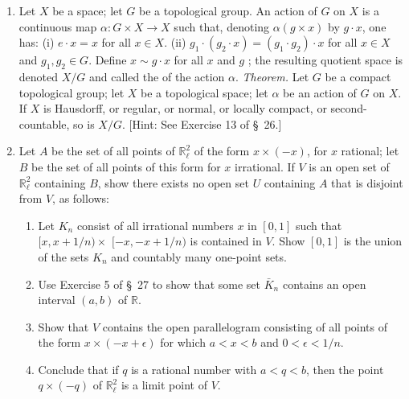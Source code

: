 \begin{enumerate}[itemsep=0.4em, parsep=0pt, topsep=0pt, partopsep=0pt, leftmargin=*, label=\arabic*., ref=\arabic*]
\begin{enumerate}[itemsep=0.2em, parsep=0pt, topsep=0pt, partopsep=0pt, leftmargin=*, label=(\alph*), align=left]
 \end{enumerate}
\item Let \(X\) be a space; let \(G\) be a topological group. An action of \(G\) on \(X\) is a continuous map \(\alpha : G \times X \rightarrow X\) such that, denoting \(\alpha ( {g \times x})\) by \(g \cdot x\), one has: (i) \(e \cdot x = x\) for all \(x \in X\). (ii) \(g_{1} \cdot ( {g_{2} \cdot x}) = ( {g_{1} \cdot {g}_{2}}) \cdot x\) for all \(x \in X\) and \(g_{1},g_{2} \in G\). Define \(x \sim g \cdot x\) for all \(x\) and \(g\) ; the resulting quotient space is denoted \(X/G\) and called the  of the action \(\alpha\). \textsl{Theorem.} Let \(G\) be a compact topological group; let \(X\) be a topological space; let \(\alpha\) be an action of \(G\) on \(X\). If \(X\) is Hausdorff, or regular, or normal, or locally compact, or second-countable, so is \(X/G\). [Hint: See Exercise 13 of \S\ 26.]
\item[*9.] Let \(A\) be the set of all points of \(\mathbb{R}_{\ell }^{2}\) of the form \(x \times ( {-x})\), for \(x\) rational; let \(B\) be the set of all points of this form for \(x\) irrational. If \(V\) is an open set of \(\mathbb{R}_{\ell }^{2}\) containing \(B\), show there exists no open set \(U\) containing \(A\) that is disjoint from \(V\), as follows:
 \begin{enumerate}[itemsep=0.2em, parsep=0pt, topsep=0pt, partopsep=0pt, leftmargin=*, label=(\alph*), align=left]
 \item Let \(K_{n}\) consist of all irrational numbers \(x\) in \([ {0,1}]\) such that \(\lbrack x,x + 1/n) \times\) \(\lbrack - x, - x + 1/n)\) is contained in \(V\). Show \([ {0,1}]\) is the union of the sets \(K_{n}\) and countably many one-point sets.
 \item Use Exercise 5 of \S\ 27 to show that some set \(\bar{K}_{n}\) contains an open interval \((a, b)\) of \(\mathbb{R}\).
 \item Show that \(V\) contains the open parallelogram consisting of all points of the form \(x \times ( {-x + \epsilon })\) for which \(a < x < b\) and \(0 < \epsilon < 1/n\).
 \item Conclude that if \(q\) is a rational number with \(a < q < b\), then the point \(q \times ( {-q})\) of \(\mathbb{R}_{\ell }^{2}\) is a limit point of \(V\). 
 \end{enumerate}
\end{enumerate}

